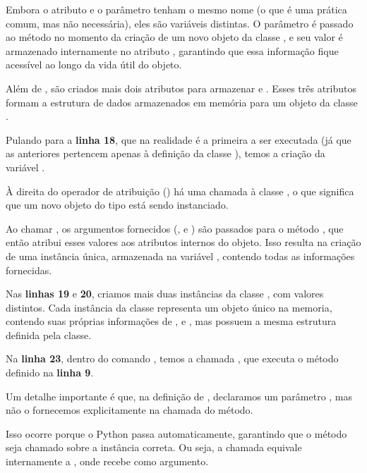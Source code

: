 Embora o atributo e o parâmetro tenham o mesmo nome (o que é uma prática comum, mas não necessária), eles são variáveis
distintas.
O parâmetro  é passado ao método  no momento da criação de um novo objeto da classe
, e seu valor é armazenado internamente no atributo , garantindo que essa
informação fique acessível ao longo da vida útil do objeto.

Além de , são criados mais dois atributos para armazenar  e .
Esses três atributos formam a estrutura de dados armazenados em memória para um objeto da classe .


Pulando para a \textbf{linha 18}, que na realidade é a primeira a ser executada (já que as anteriores pertencem apenas
à definição da classe ), temos a criação da variável .

À direita do operador de atribuição (\inlcode{=}) há uma chamada à classe , o que significa que um
novo objeto do tipo  está sendo instanciado.

Ao chamar , os argumentos
fornecidos (,  e ) são passados para o método , que
então atribui esses valores aos atributos internos do objeto.
Isso resulta na criação de uma instância única, armazenada na variável , contendo todas as
informações fornecidas.

Nas \textbf{linhas 19} e \textbf{20}, criamos mais duas instâncias da classe , com valores distintos.
Cada instância da classe representa um objeto único na memoria, contendo suas próprias informações
de ,  e , mas possuem a mesma estrutura definida pela classe.

Na \textbf{linha 23}, dentro do comando , temos a chamada  , que executa o
método  definido na \textbf{linha 9}.

Um detalhe importante é que, na definição de \inlcode{)}, declaramos um parâmetro
, mas não o fornecemos explicitamente na chamada do método.

Isso ocorre porque o Python passa  automaticamente, garantindo que o método seja chamado sobre a instância correta.
Ou seja, a chamada  equivale internamente a , onde  recebe
 como argumento.

